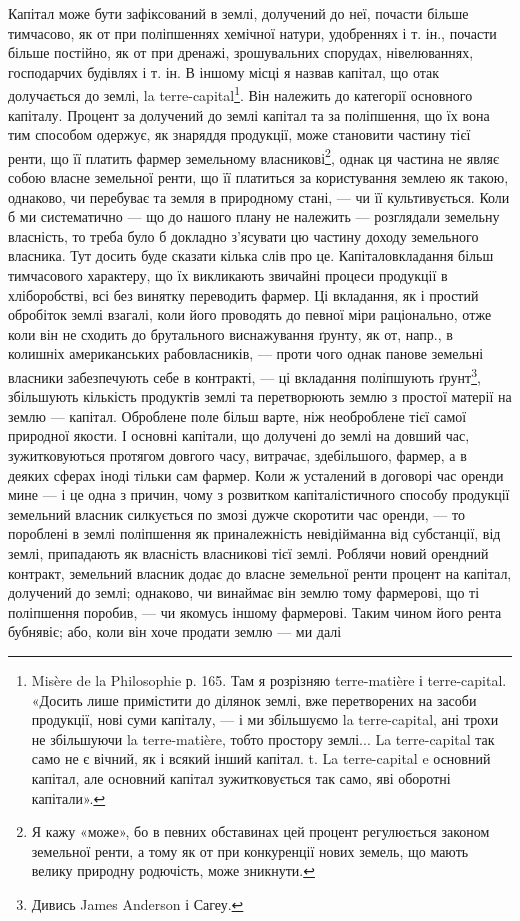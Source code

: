 Капітал може бути зафіксований в землі, долучений до неї, почасти
більше тимчасово, як от при поліпшеннях хемічної натури, удобреннях і т. ін.,
почасти більше постійно, як от при дренажі, зрошувальних спорудах, нівелюваннях,
господарчих будівлях і т. ін. В іншому місці я назвав капітал, що
отак долучається до землі, la terre-capital\footnote{
Misère de la Philosophie р. 165. Там я розрізняю terre-matière і terre-capital. «Досить лише
примістити до ділянок землі, вже перетворених на засоби продукції, нові суми капіталу, — і ми
збільшуємо la terre-capital, ані трохи не збільшуючи la terre-matière, тобто простору землі... La
terre-capital так само не є вічний, як і всякий інший капітал. t. La terre-capital e основний
капітал, але основний капітал зужитковується так само, яві оборотні капітали».
}. Він належить до категорії основного
капіталу. Процент за долучений до землі капітал та за поліпшення, що їх вона
тим способом одержує, як знаряддя продукції, може становити частину тієї
ренти, що її платить фармер земельному власникові\footnote{
Я кажу «може», бо в певних обставинах цей процент регулюється законом земельної ренти, а тому як
от при конкуренції нових земель, що мають велику природну родючість, може зникнути.
}, однак ця частина не
являє собою власне земельної ренти, що її платиться за користування землею
як такою, однаково, чи перебуває та земля в природному стані, — чи її культивується.
Коли б ми систематично — що до нашого плану не належить — розглядали
земельну власність, то треба було б докладно з’ясувати цю частину
доходу земельного власника. Тут досить буде сказати кілька слів про це.
Капіталовкладання більш тимчасового характеру, що їх викликають звичайні
процеси продукції в хліборобстві, всі без винятку переводить фармер. Ці вкладання,
як і простий обробіток землі взагалі, коли його проводять до певної
міри раціонально, отже коли він не сходить до брутального виснажування
ґрунту, як от, напр., в колишніх американських рабовласників, — проти чого
однак панове земельні власники забезпечують себе в контракті, — ці вкладання
поліпшують ґрунт\footnote{
Дивись James Anderson і Сагеу.
}, збільшують кількість продуктів землі та перетворюють
землю з простої матерії на землю — капітал. Оброблене поле більш варте, ніж
необроблене тієї самої природної якости. І основні капітали, що долучені до
землі на довший час, зужитковуються протягом довгого часу, витрачає, здебільшого,
фармер, а в деяких сферах іноді тільки сам фармер. Коли ж усталений в
договорі час оренди мине — і це одна з причин, чому з розвитком капіталістичного
способу продукції земельний власник силкується по змозі дужче скоротити
час оренди, — то пороблені в землі поліпшення як приналежність невідійманна
від субстанції, від землі, припадають як власність власникові тієї землі.
Роблячи новий орендний контракт, земельний власник додає до власне земельної
ренти процент на капітал, долучений до землі; однаково, чи винаймає він землю
тому фармерові, що ті поліпшення поробив, — чи якомусь іншому фармерові.
Таким чином його рента бубнявіє; або, коли він хоче продати землю — ми далі
\parbreak{}  %
